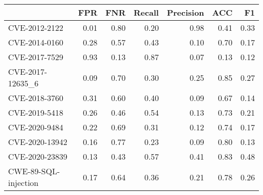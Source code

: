 \begin{tabular}{lrrrrrr}
\toprule
{} &  FPR &  FNR &  Recall &  Precision &  ACC &   F1 \\
\midrule
CVE-2012-2122        & 0.01 & 0.80 &    0.20 &       0.98 & 0.41 & 0.33 \\
CVE-2014-0160        & 0.28 & 0.57 &    0.43 &       0.10 & 0.70 & 0.17 \\
CVE-2017-7529        & 0.93 & 0.13 &    0.87 &       0.07 & 0.13 & 0.12 \\
CVE-2017-12635\_6     & 0.09 & 0.70 &    0.30 &       0.25 & 0.85 & 0.27 \\
CVE-2018-3760        & 0.31 & 0.60 &    0.40 &       0.09 & 0.67 & 0.14 \\
CVE-2019-5418        & 0.26 & 0.46 &    0.54 &       0.13 & 0.73 & 0.21 \\
CVE-2020-9484        & 0.22 & 0.69 &    0.31 &       0.12 & 0.74 & 0.17 \\
CVE-2020-13942       & 0.16 & 0.77 &    0.23 &       0.09 & 0.80 & 0.13 \\
CVE-2020-23839       & 0.13 & 0.43 &    0.57 &       0.41 & 0.83 & 0.48 \\
CWE-89-SQL-injection & 0.17 & 0.64 &    0.36 &       0.21 & 0.78 & 0.26 \\
\bottomrule
\end{tabular}
